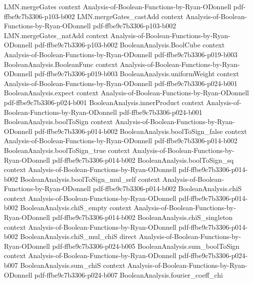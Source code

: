 \begin{lemma}
\proofstep
  {LMN.mergeGates}
  {context}
  {Analysis-of-Boolean-Functions-by-Ryan-ODonnell}
  {pdf-ffbe9c7b3306-p103-b002}
\proofstep
  {LMN.mergeGates_castAdd}
  {context}
  {Analysis-of-Boolean-Functions-by-Ryan-ODonnell}
  {pdf-ffbe9c7b3306-p103-b002}
\proofstep
  {LMN.mergeGates_natAdd}
  {context}
  {Analysis-of-Boolean-Functions-by-Ryan-ODonnell}
  {pdf-ffbe9c7b3306-p103-b002}
\proofstep
  {BooleanAnalysis.BoolCube}
  {context}
  {Analysis-of-Boolean-Functions-by-Ryan-ODonnell}
  {pdf-ffbe9c7b3306-p019-b003}
\proofstep
  {BooleanAnalysis.BooleanFunc}
  {context}
  {Analysis-of-Boolean-Functions-by-Ryan-ODonnell}
  {pdf-ffbe9c7b3306-p019-b003}
\proofstep
  {BooleanAnalysis.uniformWeight}
  {context}
  {Analysis-of-Boolean-Functions-by-Ryan-ODonnell}
  {pdf-ffbe9c7b3306-p024-b001}
\proofstep
  {BooleanAnalysis.expect}
  {context}
  {Analysis-of-Boolean-Functions-by-Ryan-ODonnell}
  {pdf-ffbe9c7b3306-p024-b001}
\proofstep
  {BooleanAnalysis.innerProduct}
  {context}
  {Analysis-of-Boolean-Functions-by-Ryan-ODonnell}
  {pdf-ffbe9c7b3306-p024-b001}
\proofstep
  {BooleanAnalysis.boolToSign}
  {context}
  {Analysis-of-Boolean-Functions-by-Ryan-ODonnell}
  {pdf-ffbe9c7b3306-p014-b002}
\proofstep
  {BooleanAnalysis.boolToSign_false}
  {context}
  {Analysis-of-Boolean-Functions-by-Ryan-ODonnell}
  {pdf-ffbe9c7b3306-p014-b002}
\proofstep
  {BooleanAnalysis.boolToSign_true}
  {context}
  {Analysis-of-Boolean-Functions-by-Ryan-ODonnell}
  {pdf-ffbe9c7b3306-p014-b002}
\proofstep
  {BooleanAnalysis.boolToSign_sq}
  {context}
  {Analysis-of-Boolean-Functions-by-Ryan-ODonnell}
  {pdf-ffbe9c7b3306-p014-b002}
\proofstep
  {BooleanAnalysis.boolToSign_mul_self}
  {context}
  {Analysis-of-Boolean-Functions-by-Ryan-ODonnell}
  {pdf-ffbe9c7b3306-p014-b002}
\proofstep
  {BooleanAnalysis.chiS}
  {context}
  {Analysis-of-Boolean-Functions-by-Ryan-ODonnell}
  {pdf-ffbe9c7b3306-p014-b002}
\proofstep
  {BooleanAnalysis.chiS_empty}
  {context}
  {Analysis-of-Boolean-Functions-by-Ryan-ODonnell}
  {pdf-ffbe9c7b3306-p014-b002}
\proofstep
  {BooleanAnalysis.chiS_singleton}
  {context}
  {Analysis-of-Boolean-Functions-by-Ryan-ODonnell}
  {pdf-ffbe9c7b3306-p014-b002}
\proofstep
  {BooleanAnalysis.chiS_mul_chiS}
  {direct}
  {Analysis-of-Boolean-Functions-by-Ryan-ODonnell}
  {pdf-ffbe9c7b3306-p024-b005}
\proofstep
  {BooleanAnalysis.sum_boolToSign}
  {context}
  {Analysis-of-Boolean-Functions-by-Ryan-ODonnell}
  {pdf-ffbe9c7b3306-p024-b007}
\proofstep
  {BooleanAnalysis.sum_chiS}
  {context}
  {Analysis-of-Boolean-Functions-by-Ryan-ODonnell}
  {pdf-ffbe9c7b3306-p024-b007}
\proofstep
  {BooleanAnalysis.fourier_coeff_chi}

\end{lemma}
